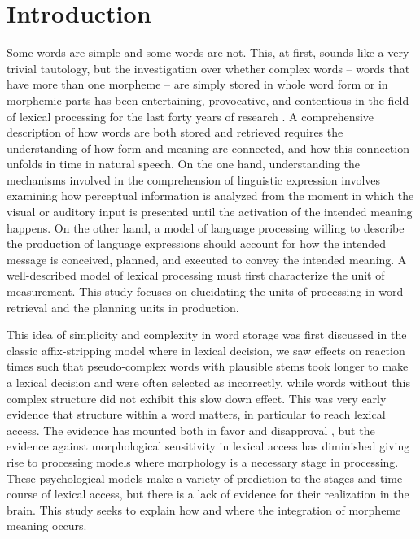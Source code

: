 \documentclass{frontiersSCNS}
\begin{document}
\section{Introduction}

	Some words are simple and some words are not. This, at first, sounds like a very trivial tautology, but the investigation over whether complex words – words that have more than one morpheme – are simply stored in whole word form \citep*{Butterworth:1983, Giraudo:2001} or in morphemic parts has been entertaining, provocative, and contentious in the field of lexical processing for the last forty years of research \citep*{Rastle:2003}. A comprehensive description of how words are both stored and retrieved requires the understanding of how form and meaning are connected, and how this connection unfolds in time in natural speech. On the one hand, understanding the mechanisms involved in the comprehension of linguistic expression involves examining how perceptual information is analyzed from the moment in which the visual or auditory input is presented until the activation of the intended meaning happens. On the other hand, a model of language processing willing to describe the production of language expressions should account for how the intended message is conceived, planned, and executed to convey the intended meaning. A well-described model of lexical processing must first characterize the unit of measurement. This study focuses on elucidating the units of processing in word retrieval and the planning units in production.

	This idea of simplicity and complexity in word storage was first discussed in the classic affix-stripping model \citep*{Taft:1975} where in lexical decision, we saw effects on reaction times such that pseudo-complex words with plausible stems took longer to make a lexical decision and were often selected as incorrectly, while words without this complex structure did not exhibit this slow down effect. This was very early evidence that structure within a word matters, in particular to reach lexical access. The evidence has mounted both in favor \citep*{Taft:2004, Marslen-Wilson:1994, Rastle:2004} and disapproval \citep*{Butterworth:1983, Giraudo:2001}, but the evidence against morphological sensitivity in lexical access has diminished giving rise to processing models where morphology is a necessary stage in processing. These psychological models make a variety of prediction to the stages and time-course of lexical access, but there is a lack of evidence for their realization in the brain. This study seeks to explain how and where the integration of morpheme meaning occurs.
\end{document}

